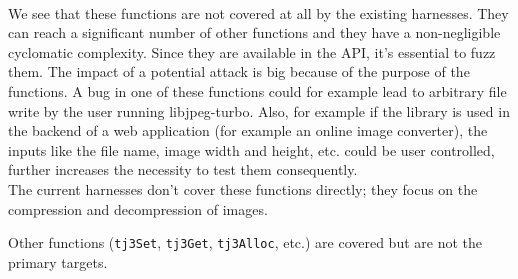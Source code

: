 \documentclass[12pt]{article}
\begin{document}
\noindent \\We see that these functions are not covered at all by the existing harnesses. They can reach a significant number of other functions and they have a non-negligible cyclomatic complexity. Since they are available in the API, it's essential to fuzz them. The impact of a potential attack is big because of the purpose of the functions. A bug in one of these functions could for example lead to arbitrary file write by the user running libjpeg-turbo. Also, for example if the library is used in the backend of a web application (for example an online image converter), the inputs like the file name, image width and height, etc. could be user controlled, further increases the necessity to test them consequently. \\

The current harnesses don't cover these functions directly; they focus on the compression and decompression of images.

Other functions (\texttt{tj3Set}, \texttt{tj3Get}, \texttt{tj3Alloc}, etc.) are covered but are not the primary targets.
\end{document}
